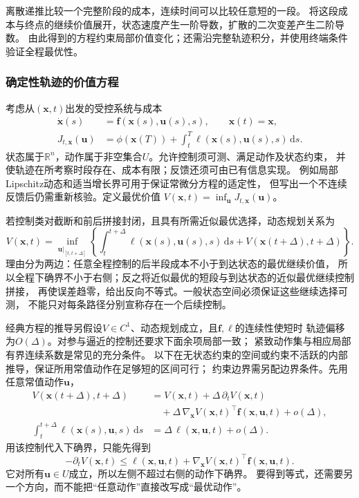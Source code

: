 离散递推比较一个完整阶段的成本，连续时间可以比较任意短的一段。
将这段成本与终点的继续价值展开，状态速度产生一阶导数，扩散的二次变差产生二阶导数。
由此得到的方程约束局部价值变化；还需沿完整轨迹积分，并使用终端条件验证全程最优性。

\subsubsection{确定性轨迹的价值方程}

考虑从$(\bm x,t)$出发的受控系统与成本
\begin{align}
  \dot{\bm x}(s)&=\bm f(\bm x(s),\bm u(s),s),\qquad \bm x(t)=\bm x,
  \label{eq:control-continuous-dynamics}\\
  J_{t,\bm x}(\bm u)
  &=\phi(\bm x(T))+\int_t^T\ell(\bm x(s),\bm u(s),s)\,\mathrm ds.
  \label{eq:control-continuous-cost}
\end{align}
状态属于$\mathbb R^n$，动作属于非空集合$U$。允许控制须可测、满足动作及状态约束，
并使轨迹在所考察时段存在、成本有限；反馈还须可由已有信息实现。
例如局部Lipschitz动态和适当增长界可用于保证常微分方程的适定性，
但写出一个不连续反馈后仍需重新核验。定义最优价值
$V(\bm x,t)=\inf_{\bm u}J_{t,\bm x}(\bm u)$。

若控制类对截断和前后拼接封闭，且具有所需近似最优选择，动态规划关系为
\begin{equation}
  V(\bm x,t)=\inf_{\bm u|_{[t,t+\Delta]}}
  \left\{\int_t^{t+\Delta}\ell(\bm x(s),\bm u(s),s)\,\mathrm ds
    +V(\bm x(t+\Delta),t+\Delta)\right\}.
  \label{eq:control-continuous-dpp}
\end{equation}
理由分为两边：任意全程控制的后半段成本不小于到达状态的最优继续价值，
所以全程下确界不小于右侧；反之将近似最优的短段与到达状态的近似最优继续控制拼接，
再使误差趋零，给出反向不等式。一般状态空间必须保证这些继续选择可测，
不能只对每条路径分别宣称存在一个后续控制。

经典方程的推导另假设$V\in C^1$、动态规划成立，且$\bm f,\ell$的连续性使短时
轨迹偏移为$O(\Delta)$。对参与逼近的控制还要求下面余项局部一致；
紧致动作集与相应局部有界连续系数是常见的充分条件。
以下在无状态约束的空间或约束不活跃的内部推导，保证所用常值动作在足够短的区间可行；
约束边界需另配边界条件。先用任意常值动作$\bm u$，
\begin{align*}
  V(\bm x(t+\Delta),t+\Delta)
  &=V(\bm x,t)+\Delta\,\partial_tV(\bm x,t)\\
  &\quad+\Delta\,\nabla_{\bm x}V(\bm x,t)^\top\bm f(\bm x,\bm u,t)
    +o(\Delta),\\
  \int_t^{t+\Delta}\ell(\bm x(s),\bm u,s)\,\mathrm ds
  &=\Delta\,\ell(\bm x,\bm u,t)+o(\Delta).
\end{align*}
用该控制代入下确界，只能先得到
\[
  -\partial_tV(\bm x,t)
  \leq\ell(\bm x,\bm u,t)+\nabla_{\bm x}V(\bm x,t)^\top\bm f(\bm x,\bm u,t).
\]
它对所有$\bm u\in U$成立，所以左侧不超过右侧的动作下确界。
要得到等式，还需要另一个方向，而不能把“任意动作”直接改写成“最优动作”。

